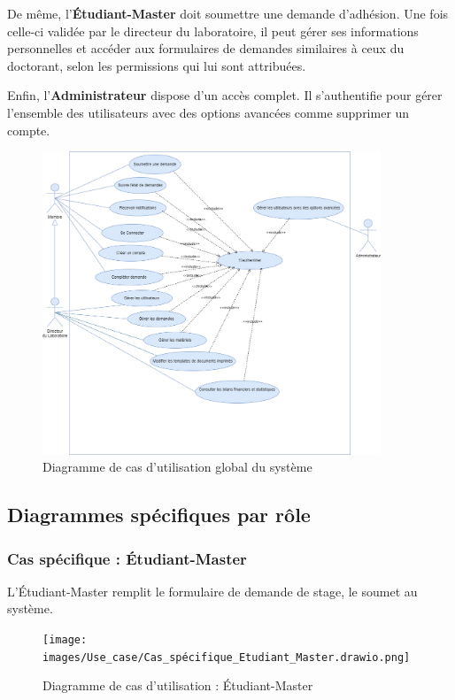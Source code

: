 De même, l’\textbf{Étudiant-Master} doit soumettre une demande d’adhésion. Une fois celle-ci validée par le directeur du laboratoire, il peut gérer ses informations personnelles et accéder aux formulaires de demandes similaires à ceux du doctorant, selon les permissions qui lui sont attribuées.

Enfin,  l'\textbf{Administrateur} dispose d'un accès complet. Il s’authentifie pour gérer l’ensemble des utilisateurs avec des options avancées comme supprimer un compte.

\begin{figure}[H]
  \centering
  \includegraphics[width=0.9\textwidth]{images/Use_case/Use-Case-Final.drawio.png}
  \caption{Diagramme de cas d'utilisation global du système}
\end{figure}

\subsection{Diagrammes spécifiques par rôle}

\subsubsection{Cas spécifique : Étudiant-Master}
L’Étudiant-Master remplit le formulaire de demande de stage, le soumet au système.

\begin{figure}[H]
  \centering
  \texttt{[image: images/Use\_case/Cas\_spécifique\_Etudiant\_Master.drawio.png]}
  \caption{Diagramme de cas d'utilisation : Étudiant-Master}
\end{figure}

